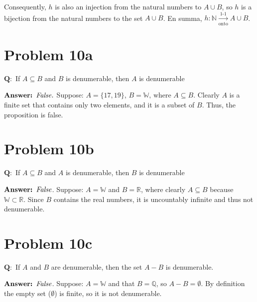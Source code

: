 \documentclass{article}
\newcommand{\OArrow}{\xrightarrow[\text{onto}]{\text{1-1}}}
\begin{document}
Consequently, $h$ is also an injection from the natural numbers to $A \cup B$, so $h$ is a bijection from the natural numbers to the set $A \cup B$. En summa, $h: \mathbb{N} \OArrow A \cup B$.
\section{Problem 10a}
$\mathbf{Q:}$ If $A \subseteq B $ and $B$ is denumerable, then $A$ is denumerable

$\\ \textbf{Answer: }\textit{False.}$ Suppose: $A = \{17, 19\}$, $B = \mathbb{W} \text{, where } A \subseteq B$. Clearly $A$ is a finite set that contains only two elements, and it is a subset of $B$. Thus, the proposition is false.

\section{Problem 10b}
$\mathbf{Q:}$ If $A \subseteq B $ and $A$ is denumerable, then $B$ is denumerable

$\\ \textbf{Answer: } \textit{False}$. Suppose: $A=\mathbb{W}$ and $B=\mathbb{R}$, where clearly $A \subseteq B$ because $\mathbb{W} \subset \mathbb{R}$. Since $B$ contains the real numbers, it is uncountably infinite and thus not denumerable.

\section{Problem 10c}
$\mathbf{Q:}$ If $A$ and $B$ are denumerable, then the set $A - B$ is denumerable.

$\\ \textbf{Answer: } \textit{False}$. Suppose: $A=\mathbb{W}$ and that $B = \mathbb{Q}$, so $A - B = \emptyset$. By definition the empty set ($\emptyset$) is finite, so it is not denumerable.
\end{document}

